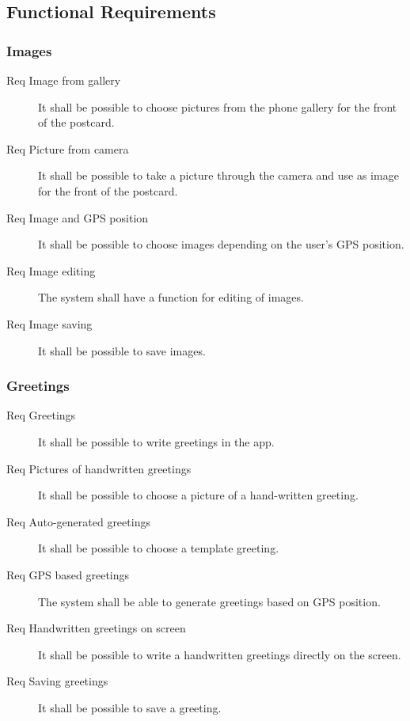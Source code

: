 \documentclass[10pt,a4paper]{article}
\begin{document}
\subsection{Functional Requirements}
\subsubsection{Images} 
\begin {description}
\item [Req  Image from gallery]It shall be possible to choose pictures from the phone gallery for the front of the postcard.
\item [Req  Picture from camera] It shall be possible to take a picture through the camera and use as image for the front of the postcard.
\item [Req  Image and GPS position] It shall be possible to choose images depending on the user's GPS position.
\item [Req  Image editing] The system shall have a function for editing of images.
\item [Req  Image saving] It shall be possible to save images.
\end{description}
\subsubsection{Greetings}
\begin{description}
\item [Req  Greetings] It shall be possible to write greetings in the app.
\item [Req  Pictures of handwritten greetings] It shall be possible to choose a picture of a hand-written greeting.
\item [Req  Auto-generated greetings] It shall be possible to choose a template greeting.
\item [Req  GPS based greetings] The system shall be able to generate greetings based on GPS position.
\item [Req  Handwritten greetings on screen] It shall be possible to write a handwritten greetings directly on the screen.
\item [Req  Saving greetings] It shall be possible to save a greeting.
\end{description}
\end{document}
